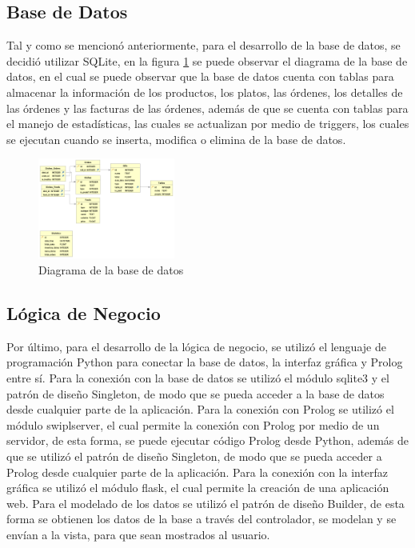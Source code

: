 \subsection{Base de Datos}

Tal y como se mencionó anteriormente, para el desarrollo de la base de datos, 
se decidió utilizar SQLite, en la figura \ref{fig:database} se puede 
observar el diagrama de la base de datos, en el cual se puede observar 
que la base de datos cuenta con tablas para almacenar la información de 
los productos, los platos, las órdenes, los detalles de las órdenes y 
las facturas de las órdenes, además de que se cuenta con tablas para 
el manejo de estadísticas, las cuales se actualizan por medio de 
triggers, los cuales se ejecutan cuando se inserta, modifica o elimina 
de la base de datos.

\begin{figure}[H]
    \centering
    \includegraphics[width=0.4\textwidth]{assets/database.png}
    \caption{Diagrama de la base de datos}
    \label{fig:database}
\end{figure}

\subsection{Lógica de Negocio}

Por último, para el desarrollo de la lógica de negocio, se utilizó el 
lenguaje de programación Python para conectar la base de datos, 
la interfaz gráfica y Prolog entre sí. Para la conexión con la base de 
datos se utilizó el módulo sqlite3 y el patrón de diseño Singleton, de modo 
que se pueda acceder a la base de datos desde cualquier parte de la 
aplicación. Para la conexión con Prolog se utilizó el módulo swiplserver, 
el cual permite la conexión con Prolog por medio de un servidor, de esta 
forma, se puede ejecutar código Prolog desde Python, además de que se 
utilizó el patrón de diseño Singleton, de modo que se pueda acceder a 
Prolog desde cualquier parte de la aplicación. Para la conexión con la 
interfaz gráfica se utilizó el módulo flask, el cual permite la creación 
de una aplicación web. Para el modelado de los datos se utilizó el 
patrón de diseño Builder, de esta forma se obtienen los datos de la base 
a través del controlador, se modelan y se envían a la vista, para que 
sean mostrados al usuario.

